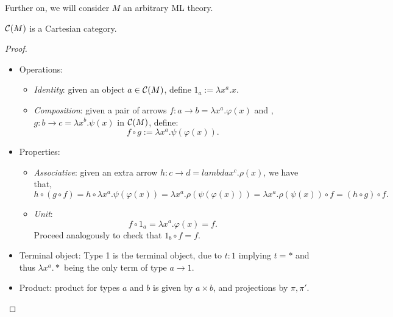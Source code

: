 Further on, we will consider $M$ an arbitrary ML theory.
\begin{proposition}\label{prop:CM1}
  $\mathcal{C}(M)$ is a Cartesian category.
\end{proposition}
\begin{proof}
    \begin{itemize}
  \item Operations:
    \begin{itemize}
      
    \item \emph{Identity}: given an object $a\in \mathcal{C}(M)$, define $1_a := \lambda x^a.x$. 
    \item \emph{Composition}: given a pair of arrows $f:a\to b =  \lambda x^a. \varphi(x)$ and , $g:b \to c = \lambda x^b. \psi(x)$ in $\mathcal{C}(M)$, define:
      $$f\circ g := \lambda x^a. \psi (\varphi(x)). $$
    \end{itemize}

  \item Properties:
    \begin{itemize}
    \item \emph{Associative}: given an extra arrow $h:c\to d = lambda x^c. \rho(x)$, we have that,
      $$h \circ (g\circ f)  = h\circ \lambda x^a.\psi(\varphi(x))  = \lambda x^a.\rho(\psi(\varphi(x))) =  \lambda x^a.\rho(\psi(x)) \circ f =  (h\circ g)\circ f.$$
    \item \emph{Unit}: 
      $$f \circ 1_a = \lambda x^a. \varphi(x) = f.$$
Proceed analogously to check that $1_b \circ f =f$.
    \end{itemize}


\item Terminal object: Type 1 is the terminal object, due to $t: 1$ implying $t=*$ and thus $\lambda x^a. *$ being the only term of type $a\to 1$. 
\item Product:  product for types $a$ and $b$ is given by $a\times b$, and projections by $\pi, \pi'$.
  \end{itemize}
\end{proof}

